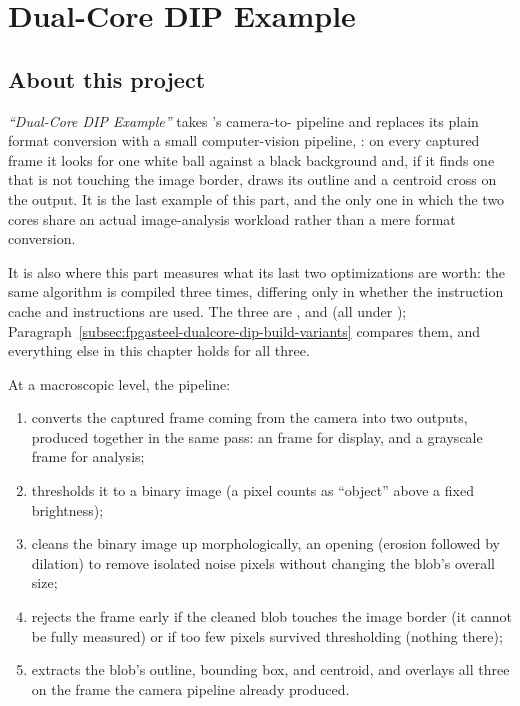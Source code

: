 \chapter{Dual-Core DIP Example}
\label{chap:fpgasteel-dualcore-dip}

\section{About this project}
\label{sec:fpgasteel-dualcore-dip-about}

\textit{``Dual-Core DIP Example''} takes 's camera-to- pipeline and replaces its plain format conversion with a small computer-vision pipeline, : on every captured frame it looks for one white ball against a black background and, if it finds one that is not touching the image border, draws its outline and a centroid cross on the  output. It is the last example of this part, and the only one in which the two cores share an actual image-analysis workload rather than a mere format conversion.

It is also where this part measures what its last two optimizations are worth: the same algorithm is compiled three times, differing only in whether the  instruction cache and  instructions are used. The three are ,  and  (all under ); Paragraph~\ref{subsec:fpgasteel-dualcore-dip-build-variants} compares them, and everything else in this chapter holds for all three.

At a macroscopic level, the pipeline:

\begin{enumerate}
 \item converts the captured  frame coming from the camera into two outputs, produced together in the same pass: an  frame for  display, and a grayscale frame for analysis;
 \item thresholds it to a binary image (a pixel counts as ``object'' above a fixed brightness);
 \item cleans the binary image up morphologically, an opening (erosion followed by dilation) to remove isolated noise pixels without changing the blob's overall size;
 \item rejects the frame early if the cleaned blob touches the image border (it cannot be fully measured) or if too few pixels survived thresholding (nothing there);
 \item extracts the blob's outline, bounding box, and centroid, and overlays all three on the  frame the camera pipeline already produced.
\end{enumerate}

